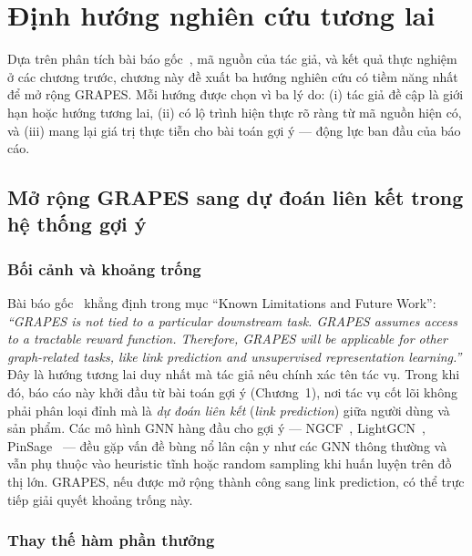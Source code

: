 \chapter{Định hướng nghiên cứu tương lai}

Dựa trên phân tích bài báo gốc~\cite{Younesian2023GRAPES}, mã nguồn của tác giả, và kết quả thực nghiệm ở các chương trước, chương này đề xuất ba hướng nghiên cứu có tiềm năng nhất để mở rộng GRAPES. Mỗi hướng được chọn vì ba lý do: (i) tác giả đề cập là giới hạn hoặc hướng tương lai, (ii) có lộ trình hiện thực rõ ràng từ mã nguồn hiện có, và (iii) mang lại giá trị thực tiễn cho bài toán gợi ý --- động lực ban đầu của báo cáo.

\section{Mở rộng GRAPES sang dự đoán liên kết trong hệ thống gợi ý}
\label{sec:linkpred}

\subsection{Bối cảnh và khoảng trống}

Bài báo gốc~\cite{Younesian2023GRAPES} khẳng định trong mục ``Known Limitations and Future Work'': \textit{``GRAPES is not tied to a particular downstream task. GRAPES assumes access to a tractable reward function. Therefore, GRAPES will be applicable for other graph-related tasks, like link prediction and unsupervised representation learning.''} Đây là hướng tương lai duy nhất mà tác giả nêu chính xác tên tác vụ. Trong khi đó, báo cáo này khởi đầu từ bài toán gợi ý (Chương~1), nơi tác vụ cốt lõi không phải phân loại đỉnh mà là \textit{dự đoán liên kết} (\textit{link prediction}) giữa người dùng và sản phẩm. Các mô hình GNN hàng đầu cho gợi ý --- NGCF~\cite{Wang2019NGCF}, LightGCN~\cite{He2020LightGCN}, PinSage~\cite{Ying2018PinSage} --- đều gặp vấn đề bùng nổ lân cận y như các GNN thông thường và vẫn phụ thuộc vào heuristic tĩnh hoặc random sampling khi huấn luyện trên đồ thị lớn. GRAPES, nếu được mở rộng thành công sang link prediction, có thể trực tiếp giải quyết khoảng trống này.

\subsection{Thay thế hàm phần thưởng}

